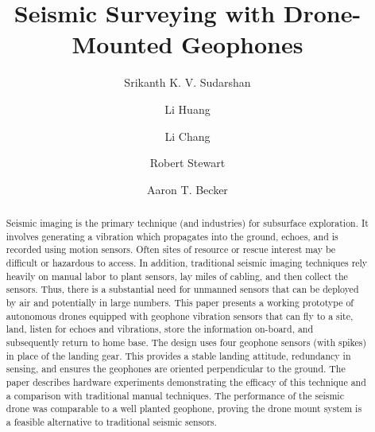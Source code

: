 \documentclass[letterpaper, 10 pt, conference]{ieeeconf}
\begin{document}
%
\title{Seismic Surveying with Drone-Mounted Geophones } 

\author[1]{\rm Srikanth K. V. Sudarshan}
\author[1]{\rm Li Huang}
\author[2]{\rm Li Chang}
\author[2]{\rm Robert Stewart}
\author[1]{\rm Aaron T. Becker}
\maketitle

\begin{abstract}

Seismic imaging is the primary technique (and industries) for subsurface exploration. It involves generating a vibration which propagates into the ground, echoes, and is recorded using motion sensors. Often sites of resource or rescue interest may be difficult or hazardous to access. In addition, traditional seismic imaging techniques rely heavily on manual labor to plant sensors, lay miles of cabling, and then collect the sensors. Thus, there is a substantial need for unmanned sensors that can be deployed by air and potentially in large numbers. This paper presents a working prototype of autonomous drones equipped with geophone vibration sensors that can fly to a site, land, listen for echoes and vibrations, store the information on-board, and subsequently return to home base.
The design uses four geophone sensors (with spikes) in place of the landing gear.  This provides a stable landing attitude, redundancy in sensing, and ensures the geophones are oriented perpendicular to the ground. The paper describes hardware experiments demonstrating the efficacy of this technique and a comparison with traditional manual techniques. The performance of the seismic drone was comparable to a well planted geophone, proving the drone mount system is a feasible alternative to traditional seismic sensors.

\end{abstract}


%

%

%






\end{document}
